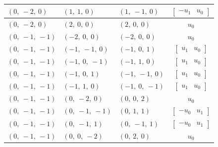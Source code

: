 \documentclass[11pt]{article}
\theoremstyle{definition}
\begin{document}
\begin{longtable}{|l|l|l|c|}
    \hline
    $\left( 0, \  -2, \  0\right)$ & $\left( 1, \  1, \  0\right)$ & $\left( 1, \  -1, \  0\right)$ & $\left[\begin{matrix}- u_{1} & u_{0}\end{matrix}\right]$ \\
    \hline
    $\left( 0, \  -2, \  0\right)$ & $\left( 2, \  0, \  0\right)$ & $\left( 2, \  0, \  0\right)$ & $u_{0}$ \\
    \hline
    $\left( 0, \  -1, \  -1\right)$ & $\left( -2, \  0, \  0\right)$ & $\left( -2, \  0, \  0\right)$ & $u_{0}$ \\
    \hline
    $\left( 0, \  -1, \  -1\right)$ & $\left( -1, \  -1, \  0\right)$ & $\left( -1, \  0, \  1\right)$ & $\left[\begin{matrix}u_{1} & u_{0}\end{matrix}\right]$ \\
    \hline
    $\left( 0, \  -1, \  -1\right)$ & $\left( -1, \  0, \  -1\right)$ & $\left( -1, \  1, \  0\right)$ & $\left[\begin{matrix}u_{1} & u_{0}\end{matrix}\right]$ \\
    \hline
    $\left( 0, \  -1, \  -1\right)$ & $\left( -1, \  0, \  1\right)$ & $\left( -1, \  -1, \  0\right)$ & $\left[\begin{matrix}u_{1} & u_{0}\end{matrix}\right]$ \\
    \hline
    $\left( 0, \  -1, \  -1\right)$ & $\left( -1, \  1, \  0\right)$ & $\left( -1, \  0, \  -1\right)$ & $\left[\begin{matrix}u_{1} & u_{0}\end{matrix}\right]$ \\
    \hline
    $\left( 0, \  -1, \  -1\right)$ & $\left( 0, \  -2, \  0\right)$ & $\left( 0, \  0, \  2\right)$ & $u_{0}$ \\
    \hline
    $\left( 0, \  -1, \  -1\right)$ & $\left( 0, \  -1, \  -1\right)$ & $\left( 0, \  1, \  1\right)$ & $\left[\begin{matrix}- u_{0} & u_{1}\end{matrix}\right]$ \\
    \hline
    $\left( 0, \  -1, \  -1\right)$ & $\left( 0, \  -1, \  1\right)$ & $\left( 0, \  -1, \  1\right)$ & $\left[\begin{matrix}- u_{0} & u_{1}\end{matrix}\right]$ \\
    \hline
    $\left( 0, \  -1, \  -1\right)$ & $\left( 0, \  0, \  -2\right)$ & $\left( 0, \  2, \  0\right)$ & $u_{0}$ \\

\end{longtable}
\end{document}
